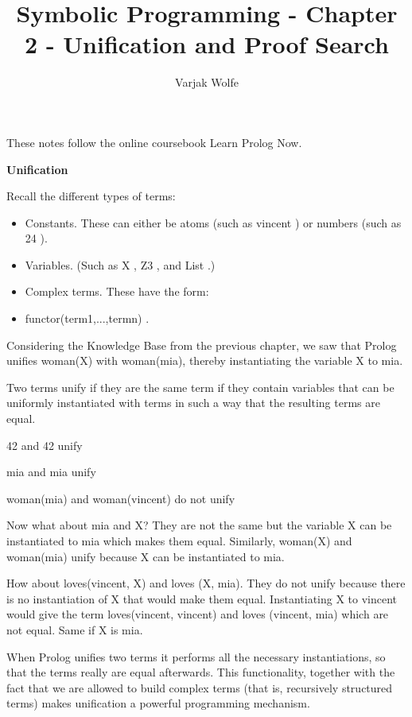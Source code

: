 \documentclass{article}
\title{Symbolic Programming -  Chapter 2 - Unification and Proof Search}
\author{Varjak Wolfe}
\begin{document}
\maketitle

These notes follow the online coursebook Learn Prolog Now.

\textbf{Unification}

Recall the different types of terms:
\begin{itemize}
\item Constants. These can either be atoms (such as vincent ) or numbers (such as 24 ).
\item Variables. (Such as X , Z3 , and List .)
\item Complex terms. These have the form:
\item functor(term1,...,termn) .
\end{itemize}

Considering the Knowledge Base from the previous chapter, we saw that Prolog unifies woman(X) with woman(mia), thereby instantiating the variable X to mia.

Two terms unify if they are the same term if they contain variables that can be uniformly instantiated with terms in such a way that the resulting terms are equal.

42 and 42 unify

mia and mia unify

woman(mia) and woman(vincent) do not unify

Now what about mia and X? They are not the same but the variable X can be instantiated to mia which makes them equal. Similarly, woman(X) and woman(mia) unify because X can be instantiated to mia.

How about loves(vincent, X) and loves (X, mia). They do not unify because there is no instantiation of X that would make them equal. Instantiating X to vincent would give the term loves(vincent, vincent) and loves (vincent, mia) which are not equal. Same if X is mia.

When Prolog unifies two terms it performs all the necessary instantiations, so that the terms really are equal afterwards. This functionality, together with the fact that we are allowed to build complex terms (that is, recursively structured terms) makes unification a powerful programming mechanism.
\end{document}
